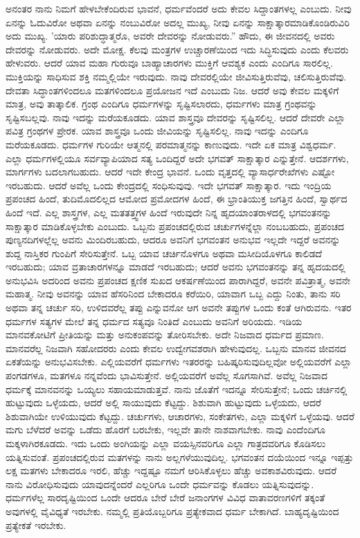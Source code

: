 ಅನಂತರ ನಾನು ನಿಮಗೆ ಹೇಳಬೇಕೆಂದಿರುವ ಭಾವನೆ, ಧರ್ಮವೆಂದರೆ ಅದು ಕೇವಲ ಸಿದ್ದಾಂತಗಳಲ್ಲ ಎಂಬುದು. ನೀವು ಏನನ್ನು ಓದುವಿರೋ ಅಥವಾ ಏನನ್ನು ನಂಬುವಿರೋ ಅದಲ್ಲ ಮುಖ್ಯ, ನೀವು ಏನನ್ನು ಸಾಕ್ಷಾತ್ಕಾರಮಾಡಿಕೊಂಡಿರುವಿರಿ ಅದು ಮುಖ್ಯ. 'ಯಾರು ಪರಿಶುದ್ಧಾತ್ಮರೊ, ಅವರೇ ದೇವರನ್ನು ನೋಡುವರು.” ಹೌದು, ಈ ಜೀವನದಲ್ಲಿ ಅವರು ದೇವರನ್ನು ನೋಡುವರು. ಅದೇ ಮೋಕ್ಷ. ಕೆಲವು ಮಂತ್ರಗಳ ಉಚ್ಚಾರಣೆಯಿಂದ ಇದು ಸಿದ್ಧಿಸುವುದು ಎಂದು ಕೆಲವರು ಹೇಳುವರು. ಆದರೆ ಯಾವ ಮಹಾ ಗುರುವೂ ಬಾಹ್ಯಾಚಾರಗಳು ಮುಕ್ತಿಗೆ ಆವಶ್ಯಕ ಎಂದು ಎಂದಿಗೂ ಸಾರಲಿಲ್ಲ. ಮುಕ್ತಿಯನ್ನು ಸಾಧಿಸುವ ಶಕ್ತಿ ನಮ್ಮಲ್ಲಿಯೇ ಇರುವುದು. ನಾವು ದೇವರಲ್ಲಿಯೇ ಜೀವಿಸುತ್ತಿರುವೆವು, ಚಲಿಸುತ್ತಿರುವೆವು. ದೇವತಾ ಸಿದ್ಧಾಂತಗಳಿಂದಲೂ ಮತಗಳಿಂದಲೂ ಪ್ರಯೋಜನ ಇದೆ ಎಂಬುದು ನಿಜ. ಆದರೆ ಅವು ಕೇವಲ ಮಕ್ಕಳಿಗೆ ಮಾತ್ರ, ಅವು ತಾತ್ಕಾಲಿಕ. ಗ್ರಂಥ ಎಂದಿಗೂ ಧರ್ಮಗಳನ್ನು ಸೃಷ್ಟಿಸಲಾರದು, ಧರ್ಮಗಳು ಮಾತ್ರ ಗ್ರಂಥವನ್ನು ಸೃಷ್ಟಿಸಬಲ್ಲವು. ನಾವು ಇದನ್ನು ಮರೆಯಕೂಡದು. ಯಾವ ಶಾಸ್ತ್ರವೂ ದೇವರನ್ನು ಸೃಷ್ಟಿಸಲಿಲ್ಲ. ಆದರೆ ದೇವರೇ ಎಲ್ಲಾ ಪವಿತ್ರ ಗ್ರಂಥಗಳ ಪ್ರೇರಕ. ಯಾವ ಶಾಸ್ತ್ರವೂ ಒಂದು ಜೀವಿಯನ್ನು ಸೃಷ್ಟಿಸಲಿಲ್ಲ. ನಾವು ಇದನ್ನು ಎಂದಿಗೂ ಮರೆಯಕೂಡದು. ಧರ್ಮಗಳ ಗುರಿಯೇ ಆತ್ಮನಲ್ಲಿ ಪರಮಾತ್ಮನನ್ನು ಕಾಣುವುದು. ಇದೇ ಏಕ ಮಾತ್ರ ವಿಶ್ವಧರ್ಮ. ಎಲ್ಲಾ ಧರ್ಮಗಳಲ್ಲಿಯೂ ಸರ್ವವ್ಯಾಪಿಯಾದ ಸತ್ಯ ಒಂದಿದ್ದರೆ ಅದೇ ಭಗವತ್ ಸಾಕ್ಷಾತ್ಕಾರ ಎನ್ನುತ್ತೇನೆ. ಆದರ್ಶಗಳು, ಮಾರ್ಗಗಳು ಬದಲಾಗಬಹುದು. ಆದರೆ ಇದೇ ಕೇಂದ್ರ ಭಾವನೆ. ಒಂದು ವೃತ್ತದಲ್ಲಿ ವ್ಯಾಸಾರ್ಧರೇಖೆಗಳು ಎಷ್ಟೋ ಇರಬಹುದು. ಆದರೆ ಅವೆಲ್ಲ ಒಂದು ಕೇಂದ್ರದಲ್ಲಿ ಸಂಧಿಸುವುವು. ಇದೇ ಭಗವತ್ ಸಾಕ್ಷಾತ್ಕಾರ. ಇದು ಇಂದ್ರಿಯ ಪ್ರಪಂಚದ ಹಿಂದೆ, ತುದಿಮೊದಲಿಲ್ಲದ ಆಮೋದ ಪ್ರಮೋದಗಳ ಹಿಂದೆ, ಈ ಭ್ರಾಂತಿಯುಕ್ತ ಜಗತ್ತಿನ ಹಿಂದೆ, ಸ್ವಾರ್ಥದ ಹಿಂದೆ ಇದೆ. ಎಲ್ಲ ಶಾಸ್ತ್ರಗಳ, ಎಲ್ಲ ಮತತತ್ತ್ವಗಳ ಹಿಂದೆ ಇರುವುದೇ ನಿನ್ನ ಹೃದಯಾಂತರಾಳದಲ್ಲಿ ಭಗವಂತನನ್ನು ಸಾಕ್ಷಾತ್ಕಾರ ಮಾಡಿಕೊಳ್ಳಬೇಕು ಎಂಬುದು. ಒಬ್ಬನು ಪ್ರಪಂಚದಲ್ಲಿರುವ ಚರ್ಚುಗಳನ್ನೆಲ್ಲಾ ನಂಬಬಹುದು, ಪ್ರಪಂಚದ ಪುಣ್ಯನದಿಗಳಲ್ಲೆಲ್ಲ ಅವನು ಮಿಂದಿರಬಹುದು, ಆದರೂ ಅವನಿಗೆ ಭಗವಂತನ ಅನುಭವ ಇಲ್ಲದೇ ಇದ್ದರೆ ಅವನನ್ನು ಶುದ್ದ ನಾಸ್ತಿಕರ ಗುಂಪಿಗೆ ಸೇರಿಸುತ್ತೇನೆ. ಒಬ್ಬ ಯಾವ ಚರ್ಚಿನೊಳಗೂ ಅಥವಾ ಮಸೀದಿಯೊಳಗೂ ಕಾಲಿಡದೆ ಇರಬಹುದು; ಯಾವ ವ್ರತಾಚಾರಗಳನ್ನೂ ಮಾಡದೆ ಇರಬಹುದು; ಆದರೆ ಅವನು ಭಗವಂತನನ್ನು ತನ್ನ ಹೃದಯದಲ್ಲಿ ಅನುಭವಿಸಿ ಅದರಿಂದ ಅವನು ಪ್ರಪಂಚದ ಕ್ಷಣಿಕ ಸುಖದ ಆಕರ್ಷಣೆಯಿಂದ ಪಾರಾಗಿದ್ದರೆ, ಅವನೇ ಪವಿತ್ರಾತ್ಮ, ಅವನೇ ಮಹಾತ್ಮ. ನೀವು ಅವನನ್ನು ಯಾವ ಹೆಸರಿನಿಂದ ಬೇಕಾದರೂ ಕರೆಯಿರಿ, ಯಾವಾಗ ಒಬ್ಬ ಎದ್ದು ನಿಂತು, ತಾನು ಸರಿ ಅಥವಾ ತನ್ನ ಚರ್ಚು ಸರಿ, ಉಳಿದವರೆಲ್ಲ ತಪ್ಪು ಎನ್ನುವನೋ ಆಗ ಅವನೇ ತಪ್ಪುಗಳ ಒಂದು ಕಂತೆ ಆಗಿರುವನು. ಇತರ ಧರ್ಮಗಳ ಸತ್ಯಗಳ ಮೇಲೆ ತನ್ನ ಧರ್ಮದ ಸತ್ಯವೂ ನಿಂತಿದೆ ಎಂಬುದು ಅವನಿಗೆ ಅರಿಯದು. ಇಡಿಯ ಮಾನವಕೋಟಿಗೆ ಪ್ರೀತಿಯನ್ನು ಮತ್ತು ಅನುಕಂಪವನ್ನು ತೋರಿಸಬೇಕು. ಅದೇ ನಿಜವಾದ ಧರ್ಮದ ಪ್ರಮಾಣ. ಮಾನವರೆಲ್ಲ ನಿಜವಾಗಿ ಸಹೋದರರು ಎಂದು ಕೇವಲ ಉದ್ವೇಗವಶರಾಗಿ ಹೇಳುವುದಲ್ಲ. ಒಬ್ಬನು ಮಾನವ ಜೀವನದ ಏಕತೆಯನ್ನು ಅನುಭವಿಸಬೇಕು. ಎಲ್ಲಿಯವರೆಗೆ ಧರ್ಮಗಳು ಇತರರನ್ನು ಬಹಿಷ್ಕರಿಸುವುದಿಲ್ಲವೋ ಅಲ್ಲಿಯವರೆಗೆ ಎಲ್ಲಾ ಪಂಗಡಗಳೂ, ಮತಗಳೂ ನನ್ನವೆಂದು ಭಾವಿಸುತ್ತೇನೆ. ಅಲ್ಲಿಯವರೆಗೆ ಅವೆಲ್ಲ ಸೊಗಸಾಗಿವೆ. ಅವೆಲ್ಲ ನಿಜವಾದ ಧರ್ಮಕ್ಕೆ ಮಾನವನನ್ನು ಒಯ್ಯಲು ಸಹಾಯಮಾಡುತ್ತವೆ. ನಾನು ಜೊತೆಗೆ ಇದನ್ನೂ ಸೇರಿಸುತ್ತೇನೆ; ಒಂದು ಚರ್ಚಿನಲ್ಲಿ ಹುಟ್ಟುವುದು ಒಳ್ಳೆಯದು, ಆದರೆ ಅಲ್ಲಿ ಸಾಯುವುದು ಕೆಟ್ಟದ್ದು. ಶಿಶುವಾಗಿ ಹುಟ್ಟುವುದು ಒಳ್ಳೆಯದು, ಆದರೆ ಶಿಶುವಾಗಿಯೇ ಉಳಿಯುವುದು ಕೆಟ್ಟದ್ದು. ಚರ್ಚುಗಳು, ಆಚಾರಗಳು, ಸಂಕೇತಗಳು, ಎಲ್ಲಾ ಮಕ್ಕಳಿಗೆ ಒಳ್ಳೆಯವು. ಆದರೆ ಮಗು ಬೆಳೆದರೆ ಅವನ್ನು ಒಡೆದು ಹೊರಗೆ ಬರಬೇಕು, ಇಲ್ಲವೇ ತಾನೇ ನಾಶವಾಗಬೇಕು. ನಾವು ಎಂದೆಂದಿಗೂ ಮಕ್ಕಳಾಗಿರಕೂಡದು. ಇದು ಒಂದು ಅಂಗಿಯನ್ನು ಎಲ್ಲಾ ವಯಸ್ಸಿನವರಿಗೂ ಎಲ್ಲಾ ಗಾತ್ರದವರಿಗೂ ಕೊಡಿಸಲು ಯತ್ನಿಸುವಂತೆ. ಪ್ರಪಂಚದಲ್ಲಿರುವ ಮತಗಳನ್ನು ನಾನು ಅಲ್ಲಗಳೆಯುವುದಿಲ್ಲ. ಭಗವಂತನ ದಯೆಯಿಂದ ಇನ್ನೂ ಇಪ್ಪತ್ತು ಲಕ್ಷ ಮತಗಳು ಬೇಕಾದರೂ ಇರಲಿ, ಹೆಚ್ಚು ಇದ್ದಷ್ಟೂ ನಮಗೆ ಆರಿಸಿಕೊಳ್ಳಲು ಹೆಚ್ಚು ಅವಕಾಶವಿರುವುದು. ಆದರೆ ನಾನು ವಿರೋಧಿಸುವುದು ಯಾವುದನ್ನೆಂದರೆ ಎಲ್ಲರಿಗೂ ಒಂದೇ ಧರ್ಮವನ್ನು ಕೊಡಲು ಯತ್ನಿಸುವುದನ್ನು. ಧರ್ಮಗಳೆಲ್ಲ ಸಾರದೃಷ್ಟಿಯಿಂದ ಒಂದೇ ಆದರೂ ಬೇರೆ ಬೇರೆ ಜನಾಂಗಗಳ ವಿವಿಧ ವಾತಾವರಣಗಳಿಗೆ ತಕ್ಕಂತೆ ಅವುಗಳಲ್ಲಿ ವೈವಿಧ್ಯತೆ ಇರಬೇಕು. ನಮ್ಮಲ್ಲಿ ಪ್ರತಿಯೊಬ್ಬರಿಗೂ ಪ್ರತ್ಯೇಕವಾದ ಧರ್ಮ ಬೇಕಾಗಿದೆ. ಬಾಹ್ಯದೃಷ್ಟಿಯಿಂದ ಪ್ರತ್ಯೇಕತೆ ಇರಬೇಕು.

